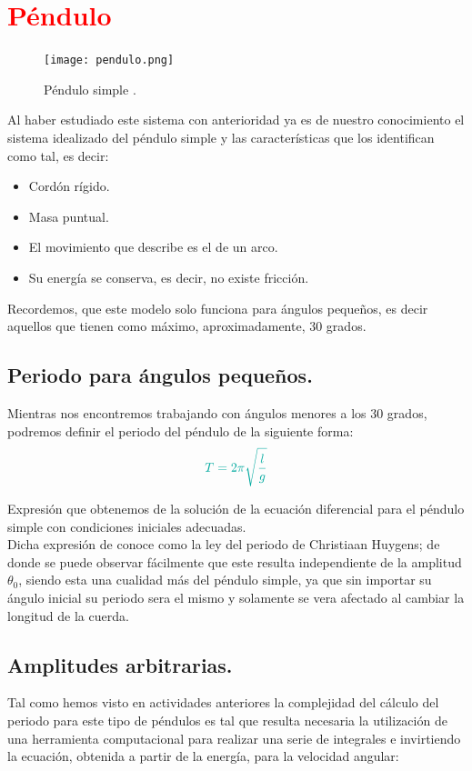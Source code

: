 \documentclass[12pt]{article}
\begin{document}
 
\section*{\textcolor{Red}{Péndulo}}
\begin{figure}
	\begin{center}
      \texttt{[image: pendulo.png]}
      \caption{Péndulo simple \cite{Img1}.}
    \end{center}
\end{figure}
Al haber estudiado este sistema con anterioridad ya es de nuestro conocimiento el sistema idealizado del péndulo simple y las características que los identifican como tal, es decir:
\begin{itemize}
\item Cordón rígido.
\item Masa puntual.
\item El movimiento que describe es el de un arco.
\item Su energía se conserva, es decir, no existe fricción.
\end{itemize}

Recordemos, que este modelo solo funciona para ángulos pequeños, es decir aquellos que tienen como máximo, aproximadamente, 30 grados.
\pagebreak
\subsection*{\textcolor{NavyBlue}{Periodo para ángulos pequeños.}}
Mientras nos encontremos trabajando con ángulos menores a los 30 grados, podremos definir el periodo del péndulo de la siguiente forma:
\begin{eqnarray*}
\textcolor{Emerald}{T = 2\pi \sqrt{\frac{l}{g}}}
\end{eqnarray*}

Expresión que obtenemos de la solución de la ecuación diferencial para el péndulo simple con condiciones iniciales adecuadas.\\
Dicha expresión de conoce como la ley del periodo de Christiaan Huygens; de donde se puede observar fácilmente que este resulta independiente de la amplitud $\theta_0$, siendo esta una cualidad más del péndulo simple, ya que sin importar su ángulo inicial su periodo sera el mismo y solamente se vera afectado al cambiar la longitud de la cuerda.\\

\subsection*{\textcolor{NavyBlue}{Amplitudes arbitrarias.}}
Tal como hemos visto en actividades anteriores la complejidad del cálculo del periodo para este tipo de péndulos es tal que resulta necesaria la utilización de una herramienta computacional para realizar una serie de integrales e invirtiendo la ecuación, obtenida a partir de la energía, para la velocidad angular:
\end{document}
